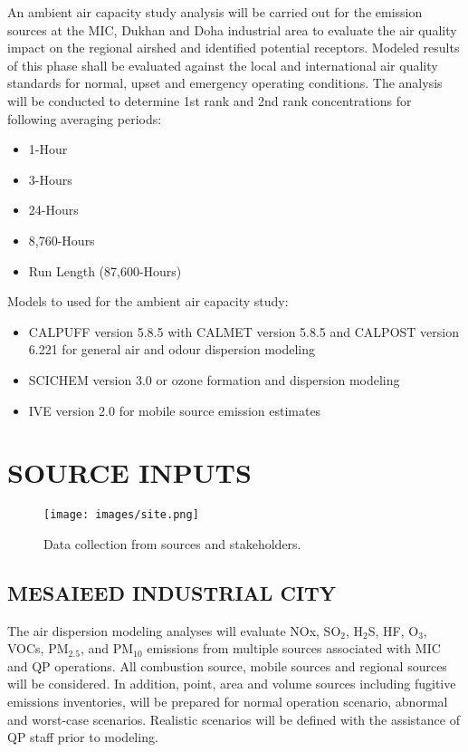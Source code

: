 An ambient air capacity study analysis will be carried out for the emission sources at the MIC, Dukhan and Doha industrial area to evaluate the air quality impact on the regional airshed and identified potential receptors. Modeled results of this phase shall be evaluated against the local and international air quality standards for normal, upset and emergency operating conditions. The analysis will be conducted to determine 1st rank and 2nd rank concentrations for following averaging periods:

\begin{itemize}
\item 1-Hour
\item 3-Hours
\item 24-Hours
\item 8,760-Hours 
\item Run Length (87,600-Hours)
\end{itemize}

Models to used for the ambient air capacity study:

\begin{itemize}
\item CALPUFF version 5.8.5  with CALMET version 5.8.5  and  CALPOST version 6.221  for general air and odour dispersion modeling
\item SCICHEM version 3.0 or ozone formation and dispersion modeling
\item IVE version 2.0 for mobile source emission estimates
\end{itemize}

\section{SOURCE INPUTS}

%
\begin{figure}[H]
\centering
\texttt{[image: images/site.png]} 
\caption{Data collection from sources and stakeholders.}
\label{fig:data}
\end{figure}
%

\subsection{MESAIEED INDUSTRIAL CITY}
The air dispersion modeling analyses will evaluate NOx, SO$_{2}$, H$_{2}$S, HF, O$_{3}$, VOCs, PM$_{2.5}$, and PM$_{10}$ emissions from multiple sources associated with MIC and QP operations.  All combustion source, mobile sources and regional sources will be considered. In addition, point, area and volume sources including fugitive emissions inventories, will be prepared for normal operation scenario, abnormal and worst-case scenarios. Realistic scenarios will be defined with the assistance of QP staff prior to modeling.\\

